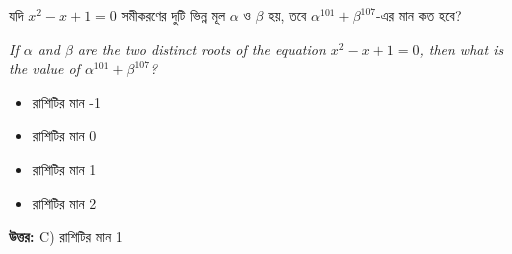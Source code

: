 \documentclass[12pt, a4paper]{article}
\begin{document}
\begin{tcolorbox}[questionbox={প্রশ্ন (Question) 28}]
    \noindent
    যদি $x^2 - x + 1 = 0$ সমীকরণের দুটি ভিন্ন মূল $\alpha$ ও $\beta$ হয়, তবে $\alpha^{101} + \beta^{107}$-এর মান কত হবে?
    
    \vspace{0.8em}
    \begin{english}
    \noindent\textit{\color{darkgray}
    If $\alpha$ and $\beta$ are the two distinct roots of the equation $x^2 - x + 1 = 0$, then what is the value of $\alpha^{101} + \beta^{107}$?
    }
    \end{english}
\end{tcolorbox}

\begin{itemize}[label={}, leftmargin=1cm, itemsep=0.5em]
    \item[\textbf{A)}] রাশিটির মান -1
    \item[\textbf{B)}] রাশিটির মান 0
    \item[\textbf{C)}] রাশিটির মান 1
    \item[\textbf{D)}] রাশিটির মান 2
\end{itemize}

\vspace{0.5em}
\begin{tcolorbox}[answerbox]
    \textbf{\color{success} উত্তর:} C) রাশিটির মান 1
\end{tcolorbox}
\vspace{1em}
\end{document}
